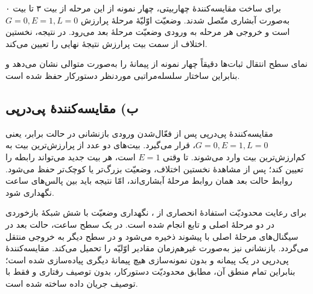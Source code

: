 \documentclass[12pt,a4paper]{article}
\begin{document}
	برای ساخت مقایسه‌کنندهٔ چهاربیتی، چهار نمونه از این مرحله از بیت ۳ تا بیت ۰ به‌صورت آبشاری متّصل شدند. وضعیّت اوّلیّهٔ مرحلهٔ پرارزش \(G=0,E=1,L=0\) است و خروجی هر مرحله به ورودی وضعیّت مرحلهٔ بعد می‌رود. در نتیجه، نخستین اختلاف از سمت بیت پرارزش نتیجهٔ نهایی را تعیین می‌کند.


	نمای سطح انتقال ثبات‌ها دقیقاً چهار نمونه از پیمانهٔ  را به‌صورت متوالی نشان می‌دهد و بنابراین ساختار سلسله‌مراتبی موردنظر دستورکار حفظ شده است.


	\subsection*{ب) مقایسه‌کنندهٔ پی‌درپی}
	مقایسه‌کنندهٔ پی‌درپی پس از فعّال‌شدن ورودی بازنشانی  در حالت برابر، یعنی \(G=0,E=1,L=0\)، قرار می‌گیرد. بیت‌های دو عدد از پرارزش‌ترین بیت به کم‌ارزش‌ترین بیت وارد می‌شوند. تا وقتی \(E=1\) است، هر بیت جدید می‌تواند رابطه را تعیین کند؛ پس از مشاهدهٔ نخستین اختلاف، وضعیّت بزرگ‌تر یا کوچک‌تر حفظ می‌شود. روابط حالت بعد همان روابط مرحلهٔ آبشاری‌اند، امّا نتیجه باید بین پالس‌های ساعت نگهداری شود.

	برای رعایت محدودیّت استفادهٔ انحصاری از ، نگهداری وضعیّت با شش شبکهٔ بازخوردی در دو مرحلهٔ اصلی و تابع انجام شده است. در یک سطح ساعت، حالت بعد در سیگنال‌های مرحلهٔ اصلی با پیشوند  ذخیره می‌شود و در سطح دیگر به خروجی منتقل می‌گردد. بازنشانی نیز به‌صورت غیرهم‌زمان مقادیر اوّلیّه را تحمیل می‌کند. مقایسه‌کنندهٔ پی‌درپی در یک پیمانه و بدون نمونه‌سازی هیچ پیمانهٔ دیگری پیاده‌سازی شده است؛ بنابراین تمام منطق آن، مطابق محدودیّت دستورکار، بدون توصیف رفتاری و فقط با توصیف جریان داده ساخته شده است.

\end{document}

